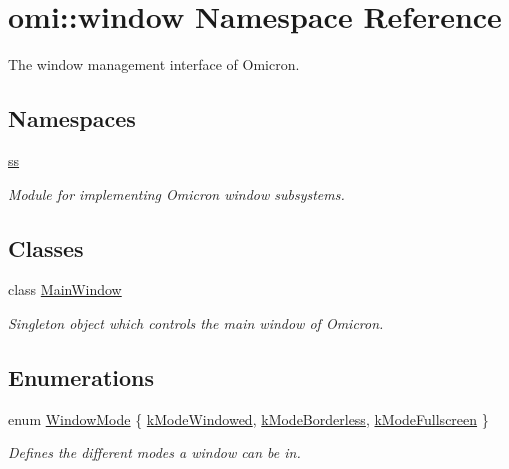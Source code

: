 \hypertarget{namespaceomi_1_1window}{}\section{omi\+:\+:window Namespace Reference}
\label{namespaceomi_1_1window}


The window management interface of Omicron.  


\subsection*{Namespaces}
\begin{DoxyCompactItemize}
\item 
 \hyperlink{namespaceomi_1_1window_1_1ss}{ss}
\begin{DoxyCompactList}\small\item\em Module for implementing Omicron window subsystems. \end{DoxyCompactList}\end{DoxyCompactItemize}
\subsection*{Classes}
\begin{DoxyCompactItemize}
\item 
class \hyperlink{classomi_1_1window_1_1_main_window}{Main\+Window}
\begin{DoxyCompactList}\small\item\em Singleton object which controls the main window of Omicron. \end{DoxyCompactList}\end{DoxyCompactItemize}
\subsection*{Enumerations}
\begin{DoxyCompactItemize}
\item 
enum \hyperlink{namespaceomi_1_1window_a096dc3d82796b93c067bca535fc0f94e}{Window\+Mode} \{ \hyperlink{namespaceomi_1_1window_a096dc3d82796b93c067bca535fc0f94ea5cdfc02e040757fdb921a45d3158d518}{k\+Mode\+Windowed}, 
\hyperlink{namespaceomi_1_1window_a096dc3d82796b93c067bca535fc0f94eac3d9c6d548d9fc4fb5025fcd82be4af6}{k\+Mode\+Borderless}, 
\hyperlink{namespaceomi_1_1window_a096dc3d82796b93c067bca535fc0f94ea34eef49c0a3476e0687277537204a73d}{k\+Mode\+Fullscreen}
 \}\begin{DoxyCompactList}\small\item\em Defines the different modes a window can be in. \end{DoxyCompactList}
\end{DoxyCompactItemize}


